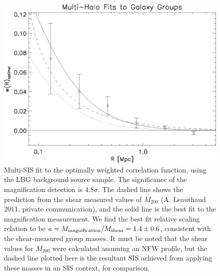 \begin{figure}
\begin{center}
\includegraphics[scale=1.0]{plots_ch2/wopt_nfw_sis_44x_LFam1_aveErr07magcut.eps}
\caption[Optimally-Weighted Cross-Correlation]{Multi-\ac{SIS} fit to the optimally weighted correlation function, using the \ac{LBG} background source sample. The significance of the magnification detection is $4.8 \sigma$.  The dashed line shows the prediction from the shear measured values of $M_{200}$ (A. Leauthaud 2011, private communication), and the solid line is the best fit to the magnification measurement.  We find the best fit relative scaling relation to be $a= M_{\rm magnification}/M_{\rm shear}=1.4 \pm 0.6$, consistent with the shear-measured group masses.  It must be noted that the shear values for $M_{200}$ were calculated assuming an \ac{NFW} profile, but the dashed line plotted here is the resultant \ac{SIS} achieved from applying these masses in an \ac{SIS} context, for comparison.}
\label{multisis}
\end{center}
\end{figure}


